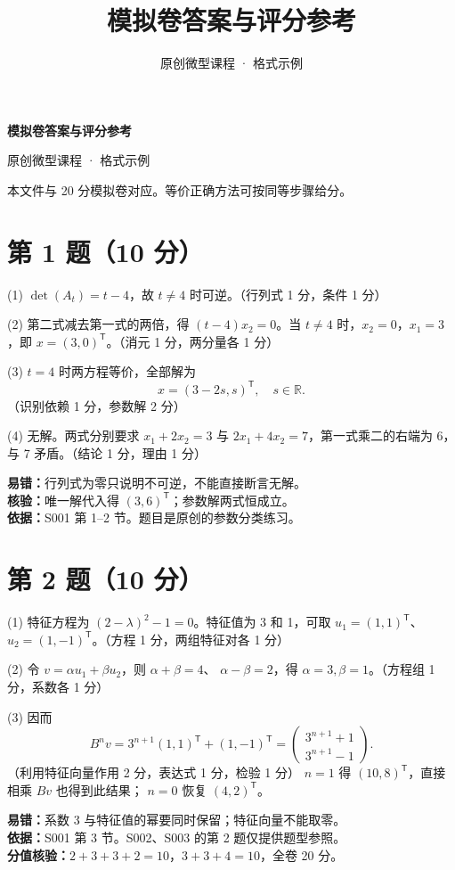 \documentclass[UTF8,fontset=fandol,zihao=-4]{ctexart}
\author{原创微型课程 · 格式示例}
\date{}
\title{模拟卷答案与评分参考}
\begin{document}
\begin{center}{\LARGE\bfseries 模拟卷答案与评分参考\par}\vspace{0.6em}原创微型课程 · 格式示例\end{center}
\vspace{0.5em}
本文件与 20 分模拟卷对应。等价正确方法可按同等步骤给分。
\section*{第 1 题（10 分）}
(1) $\det(A_t)=t-4$，故 $t\ne4$ 时可逆。（行列式 1 分，条件 1 分）

(2) 第二式减去第一式的两倍，得 $(t-4)x_2=0$。当 $t\ne4$ 时，$x_2=0$，$x_1=3$，即 $x=(3,0)^{\mathsf T}$。（消元 1 分，两分量各 1 分）

(3) $t=4$ 时两方程等价，全部解为
\[
x=(3-2s,s)^{\mathsf T},\quad s\in\mathbb R.
\]
（识别依赖 1 分，参数解 2 分）

(4) 无解。两式分别要求 $x_1+2x_2=3$ 与 $2x_1+4x_2=7$，第一式乘二的右端为 6，与 7 矛盾。（结论 1 分，理由 1 分）

\textbf{易错：}行列式为零只说明不可逆，不能直接断言无解。\\
\textbf{核验：}唯一解代入得 $(3,6)^{\mathsf T}$；参数解两式恒成立。\\
\textbf{依据：}S001 第 1--2 节。题目是原创的参数分类练习。

\section*{第 2 题（10 分）}
(1) 特征方程为 $(2-\lambda)^2-1=0$。特征值为 3 和 1，可取
$u_1=(1,1)^{\mathsf T}$、$u_2=(1,-1)^{\mathsf T}$。（方程 1 分，两组特征对各 1 分）

(2) 令 $v=\alpha u_1+\beta u_2$，则 $\alpha+\beta=4$、
$\alpha-\beta=2$，得 $\alpha=3,\beta=1$。（方程组 1 分，系数各 1 分）

(3) 因而
\[
B^n v=3^{n+1}(1,1)^{\mathsf T}+(1,-1)^{\mathsf T}
=\begin{pmatrix}3^{n+1}+1\\3^{n+1}-1\end{pmatrix}.
\]
（利用特征向量作用 2 分，表达式 1 分，检验 1 分）
$n=1$ 得 $(10,8)^{\mathsf T}$，直接相乘 $Bv$ 也得到此结果；
$n=0$ 恢复 $(4,2)^{\mathsf T}$。

\textbf{易错：}系数 3 与特征值的幂要同时保留；特征向量不能取零。\\
\textbf{依据：}S001 第 3 节。S002、S003 的第 2 题仅提供题型参照。\\
\textbf{分值核验：}$2+3+3+2=10$，$3+3+4=10$，全卷 20 分。
\end{document}
